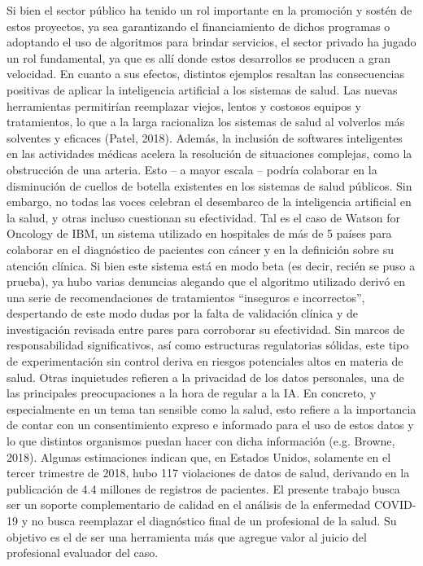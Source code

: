 \documentclass[12pt]{article}
\begin{document}
{Si bien el sector público ha tenido un rol importante en la promoción y sostén de estos proyectos, ya sea garantizando el financiamiento de dichos programas o adoptando el uso de algoritmos para brindar servicios, el sector privado ha jugado un rol fundamental, ya que es allí donde estos desarrollos se producen a gran velocidad.
En cuanto a sus efectos, distintos ejemplos resaltan las consecuencias positivas de aplicar la inteligencia artificial a los sistemas de salud. Las nuevas herramientas permitirían reemplazar viejos, lentos y costosos equipos y tratamientos, lo que a la larga racionaliza los sistemas de salud al volverlos más solventes y eficaces (Patel, 2018). Además, la inclusión de softwares inteligentes en las actividades médicas acelera la resolución de situaciones complejas, como la obstrucción de una arteria. Esto – a mayor escala – podría colaborar en la disminución de cuellos de botella existentes en los sistemas de salud públicos.
Sin embargo, no todas las voces celebran el desembarco de la inteligencia artificial en la salud, y otras incluso cuestionan su efectividad. Tal es el caso de Watson for Oncology de IBM, un sistema utilizado en hospitales de más de 5 países para colaborar en el diagnóstico de pacientes con cáncer y en la definición sobre su atención clínica. Si bien este sistema está en modo beta (es decir, recién se puso a prueba), ya hubo varias denuncias alegando que el algoritmo utilizado derivó en una serie de recomendaciones de tratamientos “inseguros e incorrectos”, despertando de este modo dudas por la falta de validación clínica y de investigación revisada entre pares para corroborar su efectividad. Sin marcos de responsabilidad significativos, así como estructuras regulatorias sólidas, este tipo de experimentación sin control deriva en riesgos potenciales altos en materia de salud.
Otras inquietudes refieren a la privacidad de los datos personales, una de las principales preocupaciones a la hora de regular a la IA. En concreto, y especialmente en un tema tan sensible como la salud, esto refiere a la importancia de contar con un consentimiento expreso e informado para el uso de estos datos y lo que distintos organismos puedan hacer con dicha información (e.g. Browne, 2018). Algunas estimaciones indican que, en Estados Unidos, solamente en el tercer trimestre de 2018, hubo 117 violaciones de datos de salud, derivando en la publicación de 4.4 millones de registros de pacientes.
El presente trabajo busca ser un soporte complementario de calidad en el análisis de la enfermedad COVID-19 y no busca reemplazar el diagnóstico final de un profesional de la salud. Su objetivo es el de ser una herramienta más que agregue valor al juicio del profesional evaluador del caso.}
\end{document}
